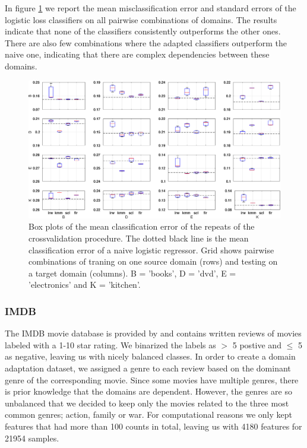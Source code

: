 \documentclass[twoside,11pt]{article}
\begin{document}
In figure \ref{err_amazon} we report the mean misclassification error and standard errors of the logistic loss classifiers on all pairwise combinations of domains. The results indicate that none of the classifiers consistently outperforms the other ones. There are also few combinations where the adapted classifiers outperform the naive one, indicating that there are complex dependencies between these domains.

\begin{figure}[ht]
	\centering
	\includegraphics[width=1\textwidth]{images/err_amazon_box.eps} 	
	\caption{Box plots of the mean classification error of the repeats of the crossvalidation procedure. The dotted black line is the mean classification error of a naive logistic regressor. Grid shows pairwise combinations of traning on one source domain (rows) and testing on a target domain (columns). B = 'books', D = 'dvd', E = 'electronics' and K = 'kitchen'.}
	\label{err_amazon}
\end{figure}


\subsubsection{IMDB}
The IMDB movie database is provided by \cite{maas2011learning} and contains written reviews of movies labeled with a 1-10 star rating. We binarized the labels as $>$ 5 postive and $\leq$ 5 as negative, leaving us with nicely balanced classes. In order to create a domain adaptation dataset, we assigned a genre to each review based on the dominant genre of the corresponding movie. Since some movies have multiple genres, there is prior knowledge that the domains are dependent. However, the genres are so unbalanced that we decided to keep only the movies related to the three most common genres; action, family or war. For computational reasons we only kept features that had more than 100 counts in total, leaving us with 4180 features for 21954 samples.
					
\end{document}

